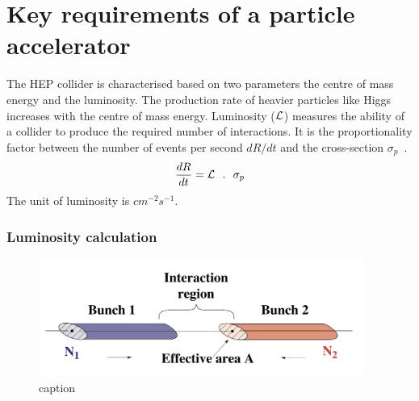{{{%
\section{Key requirements of a particle accelerator} %
\label{sub:few_key_requirements}

The HEP collider is characterised based on two parameters the centre of mass energy and the luminosity. The production rate of heavier particles like Higgs increases with the centre of mass energy. Luminosity ({$\mathcal{L}$}) measures the ability of a collider to produce the required number of interactions. It is the proportionality factor between the number of events per second $dR/dt$ and the cross-section $\sigma_p$~\cite{Muratori2006}.
\begin{equation}
	\frac{dR}{dt} = \mathcal{L} ~~.~~ \sigma_p
\end{equation}
The unit of luminosity is $cm^{-2}s^{-1}$.

\subsubsection{Luminosity calculation} %
\label{ssub:luminosity_calculation}


\begin{figure}[!htbp]
	\centering
	\includegraphics[width=0.95\textwidth]{figures/LHC/Luminosity_calculation.jpg}
	\caption{caption}
	\label{fig:label}
\end{figure}


}}}
